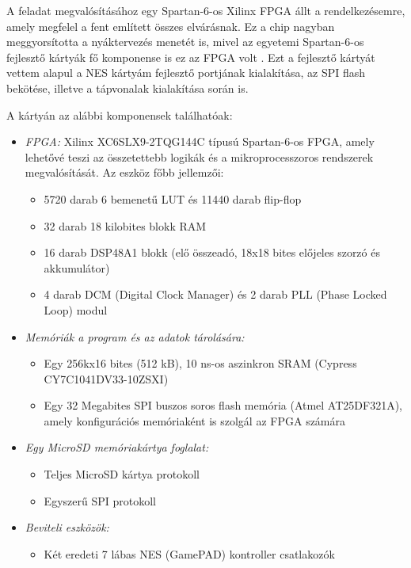 A feladat megvalósításához egy Spartan-6-os Xilinx FPGA állt a rendelkezésemre, amely megfelel a fent említett összes elvárásnak. Ez a chip nagyban meggyorsította a nyáktervezés menetét is, mivel az egyetemi Spartan-6-os fejlesztő kártyák fő komponense is ez az FPGA volt \cite{spatan6}. Ezt a fejlesztő kártyát vettem alapul a NES kártyám fejlesztő portjának kialakítása, az SPI flash bekötése, illetve a tápvonalak kialakítása során is. 
	
A kártyán az alábbi komponensek találhatóak:

\begin{itemize}
	\item \emph{FPGA:} Xilinx XC6SLX9-2TQG144C típusú Spartan-6-os FPGA, amely lehetővé teszi az összetettebb logikák és
	a mikroprocesszoros rendszerek megvalósítását. Az eszköz főbb jellemzői:
		\begin{itemize}
			\item 5720 darab 6 bemenetű LUT és 11440 darab flip-flop
			\item 32 darab 18 kilobites blokk RAM
			\item 16 darab DSP48A1 blokk (elő összeadó, 18x18 bites előjeles szorzó és akkumulátor)
			\item 4 darab DCM (Digital Clock Manager) és 2 darab PLL (Phase Locked Loop) modul
		\end{itemize} 
	\item \emph{Memóriák a program és az adatok tárolására:}
		\begin{itemize}
			\item Egy 256kx16 bites (512 kB), 10 ns-os aszinkron SRAM (Cypress CY7C1041DV33-10ZSXI)
			\item Egy 32 Megabites SPI buszos soros flash memória (Atmel AT25DF321A), amely
			konfigurációs memóriaként is szolgál az FPGA számára
		\end{itemize}
	\item \emph{Egy MicroSD memóriakártya foglalat:}
		\begin{itemize}
			\item Teljes MicroSD kártya protokoll
			\item Egyszerű SPI protokoll
		\end{itemize}
	\item \emph{Beviteli eszközök:}
		\begin{itemize}
			\item Két eredeti 7 lábas NES (GamePAD) kontroller csatlakozók

\end{itemize}
\end{itemize}
